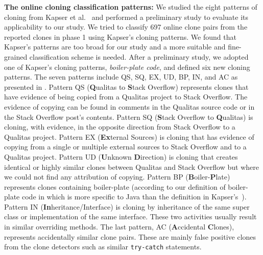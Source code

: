 \documentclass[10pt,journal,compsoc]{IEEEtran}
\begin{document}
\textbf{The online cloning classification patterns:} 
We studied the eight patterns of cloning from Kapser et
al.~\cite{Kapser2006,Kapser2008} and performed a preliminary study to
evaluate its applicability to our study. 
We tried to classify 697 online clone pairs from
the reported clones in phase 1 
using Kapser's cloning patterns. We found that 
Kapser's patterns are too broad for our study and a
more suitable and fine-grained classification scheme is needed. After
a preliminary study, we adopted one of Kapser's cloning patterns,
\emph{boiler-plate code}, and defined
six new cloning patterns. The seven patterns include QS, SQ, EX, UD, BP,
IN, and AC as presented in . Pattern
QS (\textbf{Q}ualitas to \textbf{S}tack Overflow) represents clones
that have evidence of being copied from a Qualitas project to Stack
Overflow. The evidence of copying can be found in comments in the
Qualitas source code or in the Stack Overflow post's contents. Pattern
SQ (\textbf{S}tack Overflow to \textbf{Q}ualitas) is cloning, with
evidence, in the opposite direction from Stack Overflow to a Qualitas
project. Pattern EX (\textbf{Ex}ternal Sources) is cloning that has
evidence of copying from a single or multiple external sources to
Stack Overflow and to a Qualitas project.  Pattern UD
(\textbf{U}nknown \textbf{D}irection) is cloning that creates
identical or highly similar clones between Qualitas and Stack Overflow
but where we could not find any attribution of copying.
Pattern BP (\textbf{B}oiler-\textbf{P}late) represents clones
containing boiler-plate (according to our definition of boiler-plate 
code in  which is more specific to Java
than the definition in Kapser's~\cite{Kapser2008}).
 Pattern
IN (\textbf{In}heritance/Interface) is cloning by inheritance of the
same super class or implementation of the same interface. These two
activities usually result in similar overriding methods. The last
pattern, AC (\textbf{A}ccidental \textbf{C}lones), represents
accidentally similar clone pairs. These are mainly false positive
clones from the clone detectors such as similar
{\small\texttt{try-catch}} statements.
\end{document}
